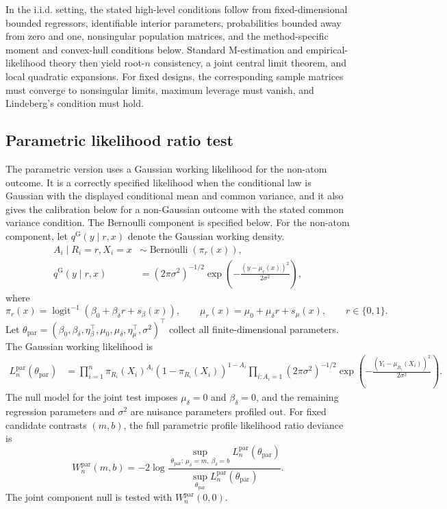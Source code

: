 \documentclass[11pt]{article}
\DeclareMathOperator{\logit}{logit}
\DeclareMathOperator{\Bernoulli}{Bernoulli}
\begin{document}
In the i.i.d. setting, the stated high-level conditions follow from fixed-dimensional bounded regressors, identifiable interior parameters, probabilities bounded away from zero and one, nonsingular population matrices, and the method-specific moment and convex-hull conditions below. Standard M-estimation and empirical-likelihood theory then yield root-$n$ consistency, a joint central limit theorem, and local quadratic expansions. For fixed designs, the corresponding sample matrices must converge to nonsingular limits, maximum leverage must vanish, and Lindeberg's condition must hold.

\subsection{Parametric likelihood ratio test}

The parametric version uses a Gaussian working likelihood for the non-atom outcome. It is a correctly specified likelihood when the conditional law is Gaussian with the displayed conditional mean and common variance, and it also gives the calibration below for a non-Gaussian outcome with the stated common variance condition. The Bernoulli component is specified below. For the non-atom component, let $q^{\mathrm G}(y\mid r,x)$ denote the Gaussian working density.
\begin{align*}
  A_i \mid R_i = r, X_i = x &\sim \Bernoulli(\pi_r(x)),\\
  q^{\mathrm G}(y\mid r,x)
  &=
  (2\pi\sigma^2)^{-1/2}
  \exp\left(-\frac{(y-\mu_r(x))^2}{2\sigma^2}\right),
\end{align*}
where
\[
  \pi_r(x)
  =
  \logit^{-1}(\beta_0 + \beta_\delta r + s_\beta(x)),
  \qquad
  \mu_r(x)
  =
  \mu_0 + \mu_\delta r + s_\mu(x),
  \qquad r \in \{0,1\}.
\]
Let $\theta_{\mathrm{par}} = (\beta_0,\beta_\delta,\eta_\beta^\top,\mu_0,\mu_\delta,\eta_\mu^\top,\sigma^2)^\top$ collect all finite-dimensional parameters. The Gaussian working likelihood is
\begin{align*}
  L_n^{\mathrm{par}}(\theta_{\mathrm{par}})
  &=
  \prod_{i=1}^n
    \pi_{R_i}(X_i)^{A_i}
    (1-\pi_{R_i}(X_i))^{1-A_i}
  \prod_{i:A_i=1}
    (2\pi\sigma^2)^{-1/2}
    \exp\left(-\frac{(Y_i-\mu_{R_i}(X_i))^2}{2\sigma^2}\right).
\end{align*}
The null model for the joint test imposes $\mu_\delta = 0$ and $\beta_\delta = 0$, and the remaining regression parameters and $\sigma^2$ are nuisance parameters profiled out. For fixed candidate contrasts $(m,b)$, the full parametric profile likelihood ratio deviance is
\begin{equation}
\label{eq:LRTtotal}
  W_n^{\mathrm{par}}(m,b)
  =
  -2\log
  \frac{
    \sup_{\theta_{\mathrm{par}}:\,\mu_\delta=m,\ \beta_\delta=b} L_n^{\mathrm{par}}(\theta_{\mathrm{par}})
  }{
    \sup_{\theta_{\mathrm{par}}} L_n^{\mathrm{par}}(\theta_{\mathrm{par}})
  }.
\end{equation}
The joint component null is tested with $W_n^{\mathrm{par}}(0,0)$.
\end{document}
